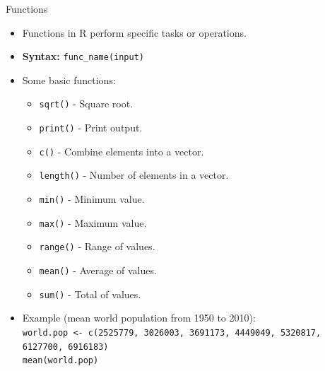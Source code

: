 \documentclass[aspectratio=169]{beamer}
\begin{document}
\begin{frame}{Functions}

    \begin{itemize}
        \item Functions in R perform specific tasks or operations.\smallskip
        \item \textbf{Syntax:} \texttt{func\_name(input)}\smallskip
        \item Some basic functions:
        \begin{itemize}
            \item[$\bullet$] \texttt{sqrt()} - Square root.
            \item[$\bullet$] \texttt{print()} - Print output.
            \item[$\bullet$] \texttt{c()} - Combine elements into a vector.
            \item[$\bullet$] \texttt{length()} - Number of elements in a vector.
            \item[$\bullet$] \texttt{min()} - Minimum value.
            \item[$\bullet$] \texttt{max()} - Maximum value.
            \item[$\bullet$] \texttt{range()} - Range of values.
            \item[$\bullet$] \texttt{mean()} - Average of values.
            \item[$\bullet$] \texttt{sum()} - Total of values.\smallskip
        \end{itemize}
        \item Example (mean world population from 1950 to 2010): \\
        \small \texttt{world.pop <- c(2525779, 3026003, 3691173, 4449049, 5320817, 6127700, 6916183)} \\
        \texttt{mean(world.pop)}
    \end{itemize}

\end{frame}
\end{document}
